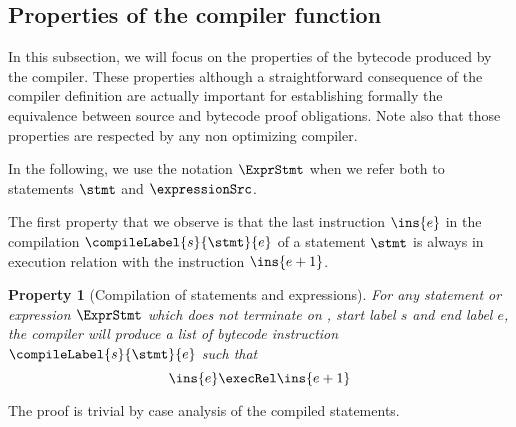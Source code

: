 
\newtheorem{compProp0}{Property}[subsection]
\newtheorem{compProp1}[compProp0]{Property} %
\newtheorem{compProp2}[compProp0]{Property} %
\newtheorem{compProp6}[compProp0]{Property} %
\newtheorem{compProp3}[compProp0]{Property} %
\newtheorem{compProp7}[compProp0]{Property} %
\newtheorem{compProp4}[compProp0]{Property} %
\newtheorem{compProp5}[compProp0]{Property} %
\newtheorem{compProp8}[compProp0]{Property} %
\newtheorem{compProp9}[compProp0]{Property}
\newtheorem{compProp10}[compProp0]{Property}
\newtheorem{seqInstr}{Definition}[subsection]




 
\newcommand{\isStartExc}[1]{\mbox{\rm\textit{isExcHandlerStart}}(#1)}
\subsection{Properties of the compiler function}\label{compile:prop}

In this subsection, we will focus on the properties of the  bytecode produced by the compiler.
These properties although a straightforward consequence of the compiler definition
 are actually important for establishing formally the equivalence between source and bytecode 
proof obligations. Note also that those properties are respected by any non optimizing compiler.


In the following, we use the notation $\ExprStmt$ when we refer both to statements $\stmt$ and $\expressionSrc$.
 
The first property that we observe is that the last instruction $\ins{e}$ in the compilation
 $\compileLabel{s}{\stmt}{e}$  of a statement $\stmt$ is always in execution relation with the
  instruction $\ins{e + 1}$.

\begin{compProp0}[Compilation of statements and expressions]\label{compile:prop:compProp0}
 For any statement or expression $\ExprStmt$ which does not terminate on \return, start label $s$ and end label $e$,
    the compiler will produce a list of bytecode instruction $\compileLabel{s}{\stmt}{e}$ such that 
     $$ \ins{e} \execRel \ins{e+1}$$
\end{compProp0}
The proof is trivial by case analysis of the compiled statements.


